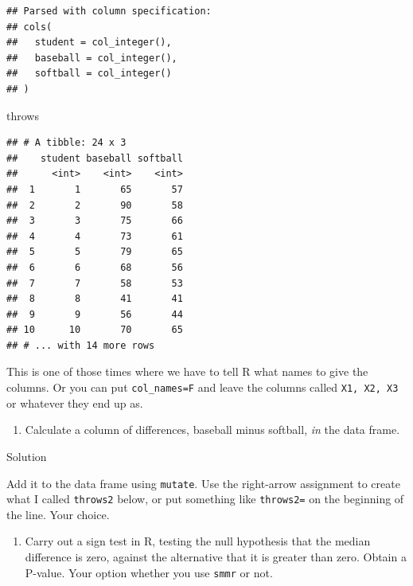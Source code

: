 \documentclass[]{tufte-book}
\newenvironment{Shaded}{}{}
\newcommand{\DataTypeTok}[1]{\textcolor[rgb]{0.56,0.13,0.00}{#1}}
\newcommand{\KeywordTok}[1]{\textcolor[rgb]{0.00,0.44,0.13}{\textbf{#1}}}
\newcommand{\NormalTok}[1]{#1}
\newcommand{\OperatorTok}[1]{\textcolor[rgb]{0.40,0.40,0.40}{#1}}
\newcommand{\StringTok}[1]{\textcolor[rgb]{0.25,0.44,0.63}{#1}}
\providecommand{\tightlist}{%
  \setlength{\itemsep}{0pt}\setlength{\parskip}{0pt}}
\theoremstyle{definition}
\theoremstyle{definition}
\theoremstyle{definition}
\theoremstyle{remark}
\begin{document}
\begin{verbatim}
## Parsed with column specification:
## cols(
##   student = col_integer(),
##   baseball = col_integer(),
##   softball = col_integer()
## )
\end{verbatim}

\begin{Shaded}
\begin{Highlighting}[]
\NormalTok{throws}
\end{Highlighting}
\end{Shaded}

\begin{verbatim}
## # A tibble: 24 x 3
##    student baseball softball
##      <int>    <int>    <int>
##  1       1       65       57
##  2       2       90       58
##  3       3       75       66
##  4       4       73       61
##  5       5       79       65
##  6       6       68       56
##  7       7       58       53
##  8       8       41       41
##  9       9       56       44
## 10      10       70       65
## # ... with 14 more rows
\end{verbatim}

This is one of those times where we have to tell R what names to give
the columns. Or you can put \texttt{col\_names=F} and leave the columns
called \texttt{X1,\ X2,\ X3} or whatever they end up as.

\begin{enumerate}
\def\labelenumi{(\alph{enumi})}
\setcounter{enumi}{1}
\tightlist
\item
  Calculate a column of differences, baseball minus softball, \emph{in}
  the data frame.
\end{enumerate}

Solution

Add it to the data frame using \texttt{mutate}. Use the right-arrow
assignment to create what I called \texttt{throws2} below, or put
something like \texttt{throws2=} on the beginning of the line. Your
choice.

\begin{Shaded}
\end{Shaded}

\begin{enumerate}
\def\labelenumi{(\alph{enumi})}
\setcounter{enumi}{2}
\tightlist
\item
  Carry out a sign test in R, testing the null hypothesis that the
  median difference is zero, against the alternative that it is greater
  than zero. Obtain a P-value. Your option whether you use \texttt{smmr}
  or not.
\end{enumerate}
\end{document}
